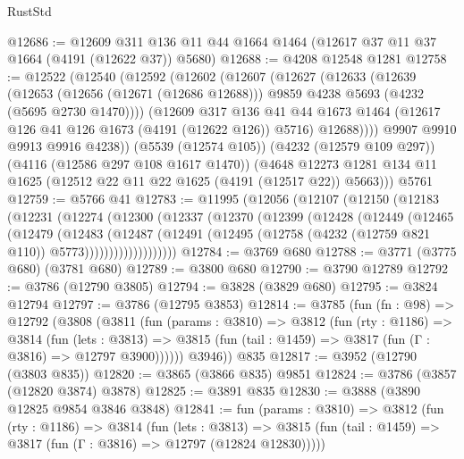 \begin{lexlean}{RustStd}
\begin{coremodule}
@12686 := @12609 @311 @136 @11 @44 @1664 @1464 (@12617 @37 @11 @37 @1664 (@4191 (@12622 @37)) @5680)
@12688 := @4208 @12548 @1281
@12758 := @12522
    (@12540
      (@12592
        (@12602
          (@12607
            (@12627
              (@12633
                (@12639
                  (@12653
                    (@12656 (@12671 (@12686 @12688)))
                    @9859
                    @4238
                    @5693
                    (@4232 (@5695 @2730 @1470))))
                (@12609
                  @317
                  @136
                  @41
                  @44
                  @1673
                  @1464
                  (@12617 @126 @41 @126 @1673 (@4191 (@12622 @126)) @5716)
                  @12688))))
          @9907
          @9910
          @9913
          @9916
          @4238))
      (@5539 (@12574 @105))
      (@4232 (@12579 @109 @297))
      (@4116 (@12586 @297 @108 @1617 @1470))
      (@4648 @12273 @1281 @134 @11 @1625 (@12512 @22 @11 @22 @1625 (@4191 (@12517 @22)) @5663)))
    @5761
@12759 := @5766 @41
@12783 := @11995
    (@12056
      (@12107
        (@12150
          (@12183
            (@12231
              (@12274
                (@12300
                  (@12337
                    (@12370
                      (@12399
                        (@12428
                          (@12449
                            (@12465
                              (@12479
                                (@12483
                                  (@12487
                                    (@12491
                                      (@12495
                                        (@12758 (@4232 (@12759 @821 @110)) @5773)))))))))))))))))))
@12784 := @3769 @680
@12788 := @3771 (@3775 @680) (@3781 @680)
@12789 := @3800 @680
@12790 := @3790 @12789
@12792 := @3786 (@12790 @3805)
@12794 := @3828 (@3829 @680)
@12795 := @3824 @12794
@12797 := @3786 (@12795 @3853)
@12814 := @3785
    (fun (fn : @98) =>
    @12792
      (@3808
        (@3811
          (fun (params : @3810) =>
          @3812
            (fun (rty : @1186) =>
            @3814
              (fun (lets : @3813) =>
              @3815 (fun (tail : @1459) => @3817 (fun (Γ : @3816) => @12797 @3900))))))
        @3946))
    @835
@12817 := @3952 (@12790 (@3803 @835))
@12820 := @3865 (@3866 @835) @9851
@12824 := @3786 (@3857 (@12820 @3874) @3878)
@12825 := @3891 @835
@12830 := @3888 (@3890 @12825 @9854 @3846 @3848)
@12841 := fun (params : @3810) =>
  @3812
    (fun (rty : @1186) =>
    @3814
      (fun (lets : @3813) =>
      @3815 (fun (tail : @1459) => @3817 (fun (Γ : @3816) => @12797 (@12824 @12830)))))

\end{coremodule}
\end{lexlean}
